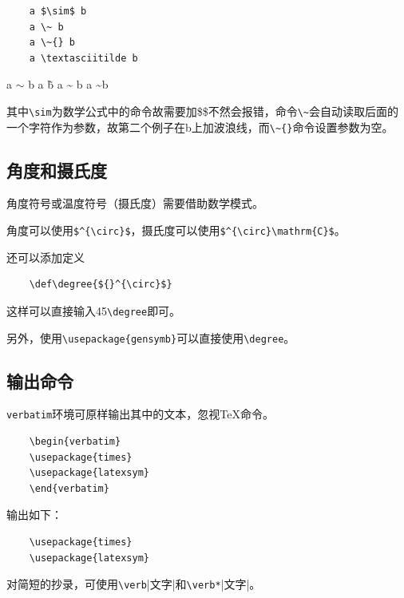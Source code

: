 \begin{lstlisting}
    a $\sim$ b
    a \~ b
    a \~{} b
    a \textasciitilde b
\end{lstlisting}

    a $\sim$ b \qquad 
    a \~ b \qquad 
    a \~{} b \qquad 
    a \textasciitilde b

其中\verb|\sim|为数学公式中的命令故需要加\$\$不然会报错，命令\verb|\~|会自动读取后面的一个字符作为参数，故第二个例子在b上加波浪线，而\verb|\~{}|命令设置参数为空。

\subsection{角度和摄氏度}

角度符号或温度符号（摄氏度）需要借助数学模式。

角度可以使用\verb|$^{\circ}$|，摄氏度可以使用\verb|$^{\circ}\mathrm{C}$|。

还可以添加定义
\begin{lstlisting}
    \def\degree{${}^{\circ}$}
\end{lstlisting}

这样可以直接输入45\verb|\degree|即可。

另外，使用\verb|\usepackage{gensymb}|可以直接使用\verb|\degree|。


\subsection{输出命令}

\verb|verbatim|环境可原样输出其中的文本，忽视TeX命令。

\begin{lstlisting}
    \begin{verbatim}
    \usepackage{times}
    \usepackage{latexsym}
    \end{verbatim}
\end{lstlisting}

输出如下：
\begin{framed}
\begin{verbatim}
    \usepackage{times}
    \usepackage{latexsym}
\end{verbatim}
\end{framed}

对简短的抄录，可使用\verb|\verb||文字|和\verb|\verb*||文字|。

